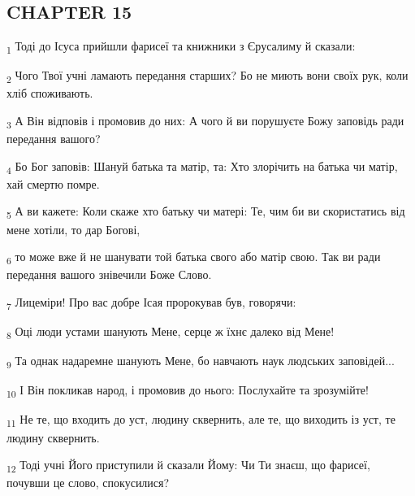 \subsection{CHAPTER 15}
\begin{tcolorbox}
\textsubscript{1} Тоді до Ісуса прийшли фарисеї та книжники з Єрусалиму й сказали:
\end{tcolorbox}
\begin{tcolorbox}
\textsubscript{2} Чого Твої учні ламають передання старших? Бо не миють вони своїх рук, коли хліб споживають.
\end{tcolorbox}
\begin{tcolorbox}
\textsubscript{3} А Він відповів і промовив до них: А чого й ви порушуєте Божу заповідь ради передання вашого?
\end{tcolorbox}
\begin{tcolorbox}
\textsubscript{4} Бо Бог заповів: Шануй батька та матір, та: Хто злорічить на батька чи матір, хай смертю помре.
\end{tcolorbox}
\begin{tcolorbox}
\textsubscript{5} А ви кажете: Коли скаже хто батьку чи матері: Те, чим би ви скористатись від мене хотіли, то дар Богові,
\end{tcolorbox}
\begin{tcolorbox}
\textsubscript{6} то може вже й не шанувати той батька свого або матір свою. Так ви ради передання вашого знівечили Боже Слово.
\end{tcolorbox}
\begin{tcolorbox}
\textsubscript{7} Лицеміри! Про вас добре Ісая пророкував був, говорячи:
\end{tcolorbox}
\begin{tcolorbox}
\textsubscript{8} Оці люди устами шанують Мене, серце ж їхнє далеко від Мене!
\end{tcolorbox}
\begin{tcolorbox}
\textsubscript{9} Та однак надаремне шанують Мене, бо навчають наук людських заповідей...
\end{tcolorbox}
\begin{tcolorbox}
\textsubscript{10} І Він покликав народ, і промовив до нього: Послухайте та зрозумійте!
\end{tcolorbox}
\begin{tcolorbox}
\textsubscript{11} Не те, що входить до уст, людину сквернить, але те, що виходить із уст, те людину сквернить.
\end{tcolorbox}
\begin{tcolorbox}
\textsubscript{12} Тоді учні Його приступили й сказали Йому: Чи Ти знаєш, що фарисеї, почувши це слово, спокусилися?
\end{tcolorbox}
